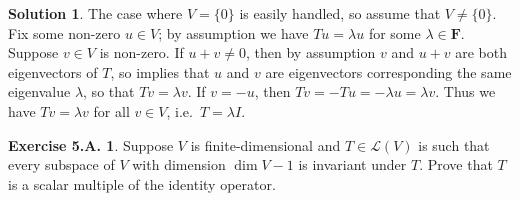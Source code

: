 \documentclass[12pt]{article}
\theoremstyle{definition}
\theoremstyle{exercise}
\newtheorem{exercise}{Exercise 5.A.}
\theoremstyle{solution}
\newtheorem*{solution}{Solution}
\newcommand{\lmap}{\mathcal{L}}
\newcommand{\F}{\mathbf{F}}
\begin{document}
\begin{solution}
    The case where \( V = \{ 0 \} \) is easily handled, so assume that \( V \neq \{ 0 \} \). Fix some non-zero \( u \in V \); by assumption we have \( Tu = \lambda u \) for some \( \lambda \in \F \). Suppose \( v \in V \) is non-zero. If \( u + v \neq 0 \), then by assumption \( v \) and \( u + v \) are both eigenvectors of \( T \), so  implies that \( u \) and \( v \) are eigenvectors corresponding the same eigenvalue \( \lambda \), so that \( Tv = \lambda v \). If \( v = -u \), then \( Tv = -Tu = -\lambda u = \lambda v \). Thus we have \( Tv = \lambda v \) for all \( v \in V \), i.e.\ \( T = \lambda I \).
\end{solution}

\begin{exercise}
\label{ex:27}
    Suppose \( V \) is finite-dimensional and \( T \in \lmap(V) \) is such that every subspace of \( V \) with dimension \( \dim V - 1 \) is invariant under \( T \). Prove that \( T \) is a scalar multiple of the identity operator.
\end{exercise}
\end{document}

